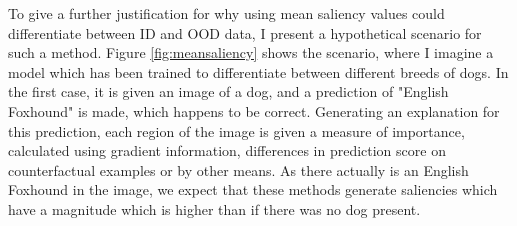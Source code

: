 \documentclass[UKenglish]{uiomasterthesis} %
\theoremstyle{definition}
\begin{document}
To give a further justification for why using mean saliency values could differentiate between ID and OOD data, I present a hypothetical scenario for such a method. Figure \ref{fig:meansaliency} shows the scenario, where I imagine a model which has been trained to differentiate between different breeds of dogs. In the first case, it is given an image of a dog, and a prediction of "English Foxhound" is made, which happens to be correct. Generating an explanation for this prediction, each region of the image is given a measure of importance, calculated using gradient information, differences in prediction score on counterfactual examples or by other means. As there actually is an English Foxhound in the image, we expect that these methods generate saliencies which have a magnitude which is higher than if there was no dog present.


\end{document}
